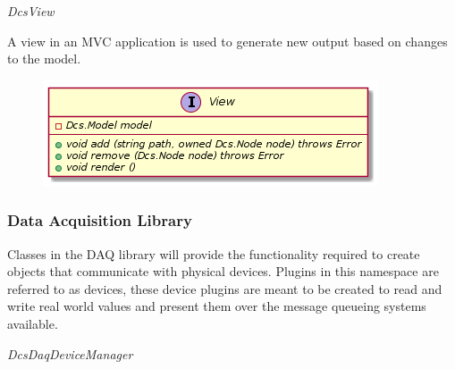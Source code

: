       \emph{DcsView}

      \vspace*{-0.75cm}
      \begin{minipage}[t]{0.5\textwidth}
        \vspace*{0.5cm}
        A view in an MVC application is used to generate new output based on
        changes to the model.
      \end{minipage} \hfill
      \begin{minipage}[t]{0.45\textwidth}
        \begin{figure}[H]
          \includegraphics[width=\textwidth]{figures/design/class/core/view}
          \label{fig:dsg-classes-view}
        \end{figure}
      \end{minipage}

    \newpage

    \subsubsection{Data Acquisition Library}\label{sec:dsg-classes-daq}

      Classes in the DAQ library will provide the functionality required to
      create objects that communicate with physical devices. Plugins in this
      namespace are referred to as devices, these device plugins are meant to be
      created to read and write real world values and present them over the
      message queueing systems available.

      \emph{DcsDaqDeviceManager}

